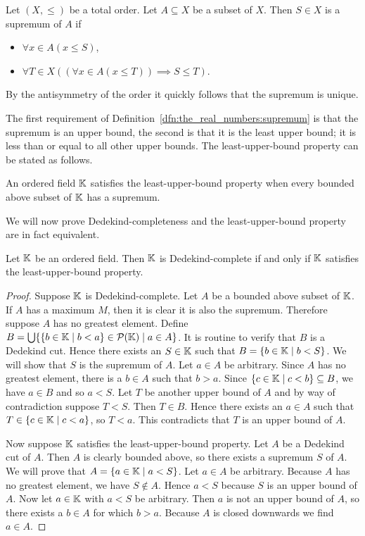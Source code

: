 \documentclass[../main.tex]{subfiles}
\begin{document}
\begin{definition}[Supremum]\label{dfn:the_real_numbers:supremum}
    Let $(X,\leq)$ be a total order. Let $A\subseteq X$ be a subset of $X$. Then $S\in X$ is a supremum of $A$ if
    \begin{itemize}
        \item $\forall x\in A(x\leq S)$,
        \item $\forall T\in X((\forall x\in A(x\leq T))\implies S\leq T)$.
    \end{itemize}
    By the antisymmetry of the order it quickly follows that the supremum is unique.
\end{definition}
The first requirement of Definition~\ref{dfn:the_real_numbers:supremum} is that the supremum is an upper bound, the second is that it is the least upper bound; it is less than or equal to all other upper bounds. The least-upper-bound property can be stated as follows.
\begin{definition}
    An ordered field $\mathbb{K}$ satisfies the least-upper-bound property when every bounded above subset of $\mathbb{K}$ has a supremum.
\end{definition}
We will now prove Dedekind-completeness and the least-upper-bound property are in fact equivalent.
\begin{proposition}\label{prp:the_real_numbers:characterisation_dedekind_complete}
    Let $\mathbb{K}$ be an ordered field. Then $\mathbb{K}$ is Dedekind-complete if and only if $\mathbb{K}$ satisfies the least-upper-bound property.
\end{proposition}
\begin{proof}
    Suppose $\mathbb{K}$ is Dedekind-complete. Let $A$ be a bounded above subset of $\mathbb{K}$. If $A$ has a maximum $M$, then it is clear it is also the supremum. Therefore suppose $A$ has no greatest element. Define $B=\bigcup\{\{b\in\mathbb{K}\mid b<a\}\in\mathcal{P}(\mathbb{K})\mid a\in A\}$. It is routine to verify that $B$ is a Dedekind cut. Hence there exists an $S\in\mathbb{K}$ such that $B=\{b\in\mathbb{K}\mid b<S\}$. We will show that $S$ is the supremum of $A$. Let $a\in A$ be arbitrary. Since $A$ has no greatest element, there is a $b\in A$ such that $b>a$. Since $\{c\in\mathbb{K}\mid c<b\}\subseteq B$, we have $a\in B$ and so $a<S$. Let $T$ be another upper bound of $A$ and by way of contradiction suppose $T<S$. Then $T\in B$. Hence there exists an $a\in A$ such that $T\in\{c\in\mathbb{K}\mid c<a\}$, so $T<a$. This contradicts that $T$ is an upper bound of $A$.

    Now suppose $\mathbb{K}$ satisfies the least-upper-bound property. Let $A$ be a Dede\-kind cut of $A$. Then $A$ is clearly bounded above, so there exists a supremum $S$ of $A$. We will prove that $A=\{a\in\mathbb{K}\mid a<S\}$. Let $a\in A$ be arbitrary. Because $A$ has no greatest element, we have $S\notin A$. Hence $a<S$ because $S$ is an upper bound of $A$. Now let $a\in\mathbb{K}$ with $a<S$ be arbitrary. Then $a$ is not an upper bound of $A$, so there exists a $b\in A$ for which $b>a$. Because $A$ is closed downwards we find $a\in A$.
\end{proof}
\end{document}
